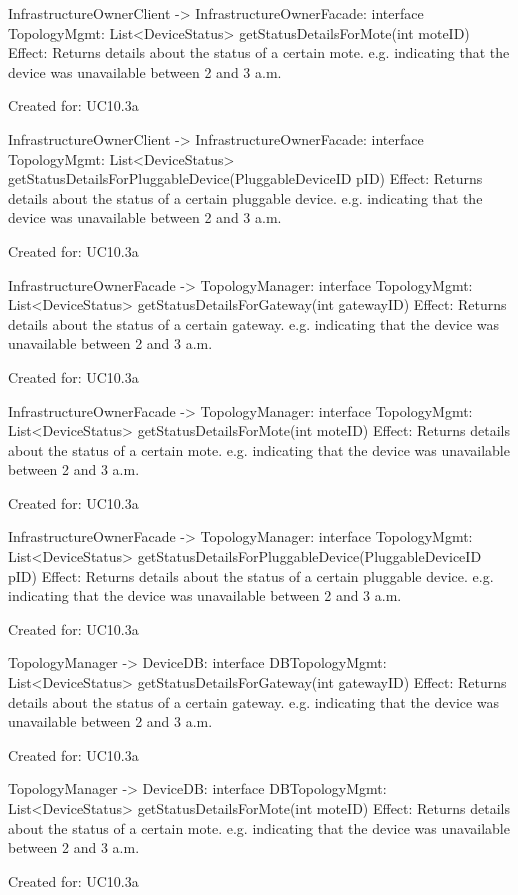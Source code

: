 {{{{{{{{{                InfrastructureOwnerClient -> InfrastructureOwnerFacade: interface TopologyMgmt: List<DeviceStatus> getStatusDetailsForMote(int moteID)
                    Effect: Returns details about the status of a certain mote. e.g. indicating that the device was unavailable between 2 and 3 a.m.
                    \item Created for: UC10.3a

                InfrastructureOwnerClient -> InfrastructureOwnerFacade: interface TopologyMgmt: List<DeviceStatus> getStatusDetailsForPluggableDevice(PluggableDeviceID pID)
                    Effect: Returns details about the status of a certain pluggable device. e.g. indicating that the device was unavailable between 2 and 3 a.m.
                    \item Created for: UC10.3a

                InfrastructureOwnerFacade -> TopologyManager: interface TopologyMgmt: List<DeviceStatus> getStatusDetailsForGateway(int gatewayID)
                    Effect: Returns details about the status of a certain gateway. e.g. indicating that the device was unavailable between 2 and 3 a.m.
                    \item Created for: UC10.3a

                InfrastructureOwnerFacade -> TopologyManager: interface TopologyMgmt: List<DeviceStatus> getStatusDetailsForMote(int moteID)
                    Effect: Returns details about the status of a certain mote. e.g. indicating that the device was unavailable between 2 and 3 a.m.
                    \item Created for: UC10.3a

                InfrastructureOwnerFacade -> TopologyManager: interface TopologyMgmt: List<DeviceStatus> getStatusDetailsForPluggableDevice(PluggableDeviceID pID)
                    Effect: Returns details about the status of a certain pluggable device. e.g. indicating that the device was unavailable between 2 and 3 a.m.
                    \item Created for: UC10.3a

                TopologyManager -> DeviceDB: interface DBTopologyMgmt: List<DeviceStatus> getStatusDetailsForGateway(int gatewayID)
                    Effect: Returns details about the status of a certain gateway. e.g. indicating that the device was unavailable between 2 and 3 a.m.
                    \item Created for: UC10.3a

                TopologyManager -> DeviceDB: interface DBTopologyMgmt: List<DeviceStatus> getStatusDetailsForMote(int moteID)
                    Effect: Returns details about the status of a certain mote. e.g. indicating that the device was unavailable between 2 and 3 a.m.
                    \item Created for: UC10.3a

}}}}}}}}}
